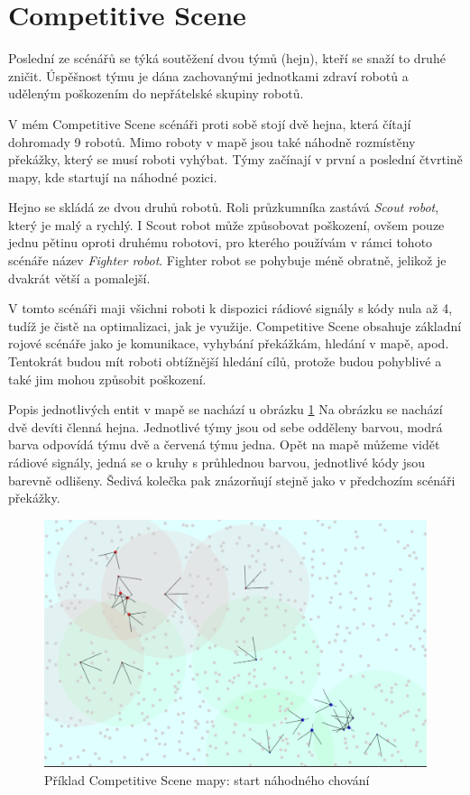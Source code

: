 \section{Competitive Scene}
Poslední ze scénářů se týká soutěžení dvou týmů (hejn), kteří se snaží to druhé zničit. Úspěšnost týmu je dána zachovanými jednotkami zdraví robotů a uděleným poškozením do nepřátelské skupiny robotů. 
 \par
 V mém Competitive Scene scénáři proti sobě stojí dvě hejna, která čítají dohromady 9 robotů. Mimo roboty v mapě jsou také náhodně rozmístěny překážky, který se musí roboti vyhýbat. Týmy začínají v první a poslední čtvrtině mapy, kde startují na náhodné pozici. 
 \par 
Hejno se skládá ze dvou druhů robotů. Roli průzkumníka zastává \textit{Scout robot}, který je malý a rychlý. I Scout robot může způsobovat poškození, ovšem pouze jednu pětinu oproti druhému robotovi, pro kterého používám v rámci tohoto scénáře název \textit{Fighter robot}. Fighter robot se pohybuje méně obratně, jelikož je dvakrát větší a pomalejší. 
\par
V tomto scénáři maji všichni roboti k dispozici rádiové signály s kódy nula až 4, tudíž je čistě na optimalizaci, jak je využije. Competitive Scene obsahuje základní rojové scénáře jako je komunikace, vyhybání překážkám, hledání v mapě, apod. Tentokrát budou mít roboti obtížnější hledání cílů, protože budou pohyblivé a také jim mohou způsobit poškození. 
\par 
Popis jednotlivých entit v mapě se nachází u obrázku \ref{obr04:CompetitiveSceneRandomStart}
\clearpage
Na obrázku se nachází dvě devíti členná hejna. Jednotlivé týmy jsou od sebe odděleny barvou, modrá barva odpovídá týmu dvě a červená týmu jedna. Opět na mapě můžeme vidět rádiové signály, jedná se o kruhy s průhlednou barvou, jednotlivé kódy jsou barevně odlišeny. Šedivá kolečka pak znázorňují stejně jako v předchozím scénáři překážky.  
\begin{figure}[h]\centering
	\includegraphics[width=\columnwidth]{../img/CompetitiveMap/CompetitiveStart.png}
	\caption{Příklad Competitive Scene mapy: start náhodného chování}
	\label{obr04:CompetitiveSceneRandomStart}
\end{figure}
\clearpage 

